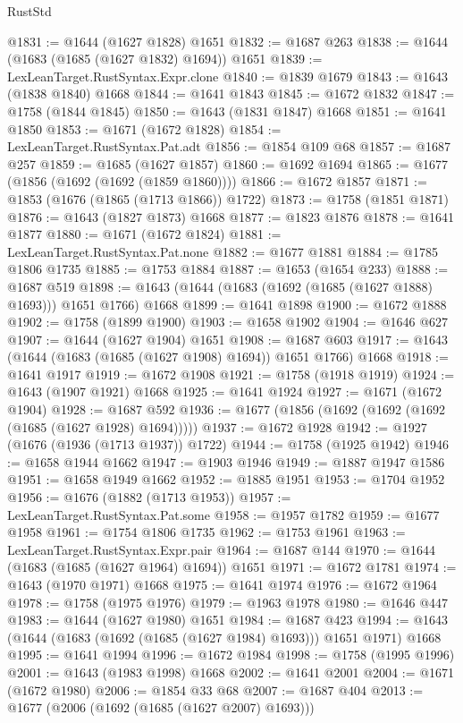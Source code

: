 \begin{lexlean}{RustStd}
\begin{coremodule}
@1831 := @1644 (@1627 @1828) @1651
@1832 := @1687 @263
@1838 := @1644 (@1683 (@1685 (@1627 @1832) @1694)) @1651
@1839 := LexLeanTarget.RustSyntax.Expr.clone
@1840 := @1839 @1679
@1843 := @1643 (@1838 @1840) @1668
@1844 := @1641 @1843
@1845 := @1672 @1832
@1847 := @1758 (@1844 @1845)
@1850 := @1643 (@1831 @1847) @1668
@1851 := @1641 @1850
@1853 := @1671 (@1672 @1828)
@1854 := LexLeanTarget.RustSyntax.Pat.adt
@1856 := @1854 @109 @68
@1857 := @1687 @257
@1859 := @1685 (@1627 @1857)
@1860 := @1692 @1694
@1865 := @1677 (@1856 (@1692 (@1692 (@1859 @1860))))
@1866 := @1672 @1857
@1871 := @1853 (@1676 (@1865 (@1713 @1866)) @1722)
@1873 := @1758 (@1851 @1871)
@1876 := @1643 (@1827 @1873) @1668
@1877 := @1823 @1876
@1878 := @1641 @1877
@1880 := @1671 (@1672 @1824)
@1881 := LexLeanTarget.RustSyntax.Pat.none
@1882 := @1677 @1881
@1884 := @1785 @1806 @1735
@1885 := @1753 @1884
@1887 := @1653 (@1654 @233)
@1888 := @1687 @519
@1898 := @1643 (@1644 (@1683 (@1692 (@1685 (@1627 @1888) @1693))) @1651 @1766) @1668
@1899 := @1641 @1898
@1900 := @1672 @1888
@1902 := @1758 (@1899 @1900)
@1903 := @1658 @1902
@1904 := @1646 @627
@1907 := @1644 (@1627 @1904) @1651
@1908 := @1687 @603
@1917 := @1643 (@1644 (@1683 (@1685 (@1627 @1908) @1694)) @1651 @1766) @1668
@1918 := @1641 @1917
@1919 := @1672 @1908
@1921 := @1758 (@1918 @1919)
@1924 := @1643 (@1907 @1921) @1668
@1925 := @1641 @1924
@1927 := @1671 (@1672 @1904)
@1928 := @1687 @592
@1936 := @1677 (@1856 (@1692 (@1692 (@1692 (@1685 (@1627 @1928) @1694)))))
@1937 := @1672 @1928
@1942 := @1927 (@1676 (@1936 (@1713 @1937)) @1722)
@1944 := @1758 (@1925 @1942)
@1946 := @1658 @1944 @1662
@1947 := @1903 @1946
@1949 := @1887 @1947 @1586
@1951 := @1658 @1949 @1662
@1952 := @1885 @1951
@1953 := @1704 @1952
@1956 := @1676 (@1882 (@1713 @1953))
@1957 := LexLeanTarget.RustSyntax.Pat.some
@1958 := @1957 @1782
@1959 := @1677 @1958
@1961 := @1754 @1806 @1735
@1962 := @1753 @1961
@1963 := LexLeanTarget.RustSyntax.Expr.pair
@1964 := @1687 @144
@1970 := @1644 (@1683 (@1685 (@1627 @1964) @1694)) @1651
@1971 := @1672 @1781
@1974 := @1643 (@1970 @1971) @1668
@1975 := @1641 @1974
@1976 := @1672 @1964
@1978 := @1758 (@1975 @1976)
@1979 := @1963 @1978
@1980 := @1646 @447
@1983 := @1644 (@1627 @1980) @1651
@1984 := @1687 @423
@1994 := @1643 (@1644 (@1683 (@1692 (@1685 (@1627 @1984) @1693))) @1651 @1971) @1668
@1995 := @1641 @1994
@1996 := @1672 @1984
@1998 := @1758 (@1995 @1996)
@2001 := @1643 (@1983 @1998) @1668
@2002 := @1641 @2001
@2004 := @1671 (@1672 @1980)
@2006 := @1854 @33 @68
@2007 := @1687 @404
@2013 := @1677 (@2006 (@1692 (@1685 (@1627 @2007) @1693)))

\end{coremodule}
\end{lexlean}
